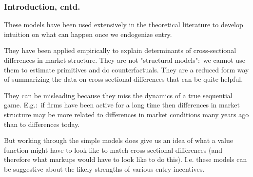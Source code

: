 \documentclass[notes=show]{beamer}
\begin{document}
\begin{frame}%

\frametitle{Introduction, cntd.}

These models have been used extensively in the theoretical literature to
develop intuition on what can happen once we endogenize entry.

\bigskip

They have been applied empirically to explain determinants of
cross-sectional differences in market structure. They are not "structural
models":\ we cannot use them to estimate primitives and do counterfactuals.
They are a reduced form way of summarizing the data on cross-sectional
differences that can be quite helpful.

\bigskip

They can be misleading because they miss the dynamics of a true sequential
game. E.g.:\ if firms have been active for a long time then differences in
market structure may be more related to differences in market conditions
many years ago than to differences today.

\bigskip

But working through the simple models does give us an idea of what a value
function might have to look like to match cross-sectional differences (and
therefore what markups would have to look like to do this). I.e. these
models can be suggestive about the likely strengths of various entry
incentives.

\end{frame}%
\end{document}
